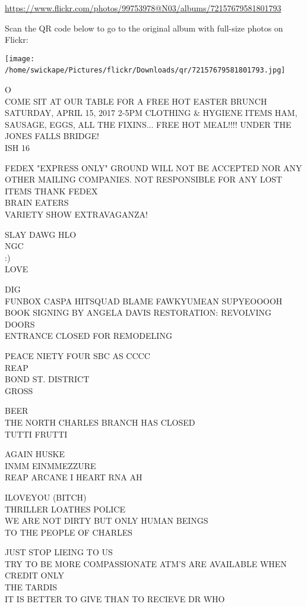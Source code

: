 \documentclass[10pt,letterpaper]{article}
\begin{document}
\url{https://www.flickr.com/photos/99753978@N03/albums/72157679581801793}

Scan the QR code below to go to the original album with full-size photos on Flickr:

\texttt{[image: /home/swickape/Pictures/flickr/Downloads/qr/72157679581801793.jpg]}
\

O\\
COME SIT AT OUR TABLE FOR A FREE HOT EASTER BRUNCH SATURDAY, APRIL 15, 2017 2{-}5PM CLOTHING \& HYGIENE ITEMS HAM, SAUSAGE, EGGS, ALL THE FIXINS... FREE HOT MEAL!!!! UNDER THE JONES FALLS BRIDGE!\\
ISH 16

FEDEX "EXPRESS ONLY" GROUND WILL NOT BE ACCEPTED NOR ANY OTHER MAILING COMPANIES.  NOT RESPONSIBLE FOR ANY LOST ITEMS THANK FEDEX\\
BRAIN EATERS\\
VARIETY SHOW EXTRAVAGANZA!

SLAY DAWG HLO\\
NGC\\
:)\\
LOVE

DIG\\
FUNBOX CASPA HITSQUAD BLAME FAWKYUMEAN SUPYEOOOOH\\
BOOK SIGNING BY ANGELA DAVIS RESTORATION: REVOLVING DOORS\\
ENTRANCE CLOSED FOR REMODELING

PEACE NIETY FOUR SBC AS CCCC\\
REAP\\
BOND ST. DISTRICT\\
GROSS

BEER\\
THE NORTH CHARLES BRANCH HAS CLOSED\\
TUTTI FRUTTI

AGAIN HUSKE\\
INMM EINMMEZZURE\\
REAP ARCANE I HEART RNA AH

ILOVEYOU (BITCH)\\
THRILLER LOATHES POLICE\\
WE ARE NOT DIRTY BUT ONLY HUMAN BEINGS\\
TO THE PEOPLE OF CHARLES

JUST STOP LIEING TO US\\
TRY TO BE MORE COMPASSIONATE ATM'S ARE AVAILABLE WHEN CREDIT ONLY\\
THE TARDIS\\
IT IS BETTER TO GIVE THAN TO RECIEVE DR WHO
\end{document}
